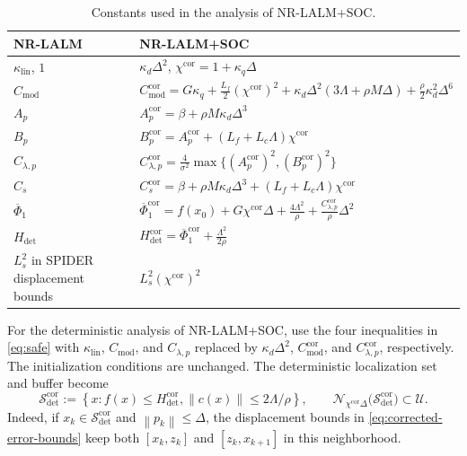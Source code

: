 \documentclass[11pt]{article}
\theoremstyle{definition}
\theoremstyle{remark}
\numberwithin{equation}{section}
\numberwithin{figure}{section}
\numberwithin{table}{section}
\numberwithin{algorithm}{section}
\newcommand{\norm}[1]{\left\lVert #1\right\rVert}
\begin{document}
\begin{table}[!t]
\caption{Constants used in the analysis of NR-LALM+SOC.}
\label{tab:corrected-constants}
\centering
\scriptsize
\renewcommand{\arraystretch}{0.94}
\begin{tabularx}{\textwidth}{@{}>{\raggedright\arraybackslash}p{}>{\raggedright\arraybackslash}X@{}}
\toprule
NR-LALM & NR-LALM+SOC\\
\midrule
\(\kappa_{\mathrm{lin}}\), \(1\)
& \(\kappa_d\Delta^2\),
  \(\chi^{\mathrm{cor}}=1+\kappa_q\Delta\)\\
\(C_{\mathrm{mod}}\)
& \(\displaystyle C_{\mathrm{mod}}^{\mathrm{cor}}
 =G\kappa_q+\frac{L_f}{2}(\chi^{\mathrm{cor}})^2
 +\kappa_d\Delta^2(3\Lambda+\rho M\Delta)
 +\frac{\rho}{2}\kappa_d^2\Delta^6\)\\
\(A_p\)
& \(\displaystyle A_p^{\mathrm{cor}}
 =\beta+\rho M\kappa_d\Delta^3\)\\
\(B_p\)
& \(\displaystyle B_p^{\mathrm{cor}}
 =A_p^{\mathrm{cor}}+(L_f+L_c\Lambda)\chi^{\mathrm{cor}}\)\\
\(C_{\lambda,p}\)
& \(\displaystyle C_{\lambda,p}^{\mathrm{cor}}
 =\frac{4}{\sigma^2}
 \max\{(A_p^{\mathrm{cor}})^2,(B_p^{\mathrm{cor}})^2\}\)\\
\(C_s\)
& \(\displaystyle C_s^{\mathrm{cor}}
 =\beta+\rho M\kappa_d\Delta^3
 +(L_f+L_c\Lambda)\chi^{\mathrm{cor}}\)\\
\(\overline\Phi_1\)
& \(\displaystyle \overline\Phi_1^{\mathrm{cor}}
 =f(x_0)+G\chi^{\mathrm{cor}}\Delta+\frac{4\Lambda^2}{\rho}
 +\frac{C_{\lambda,p}^{\mathrm{cor}}}{\rho}\Delta^2\)\\
\(H_{\mathrm{det}}\)
& \(\displaystyle H_{\mathrm{det}}^{\mathrm{cor}}
 =\overline\Phi_1^{\mathrm{cor}}+\frac{\Lambda^2}{2\rho}\)\\
\(L_s^2\) in SPIDER displacement bounds
& \(L_s^2(\chi^{\mathrm{cor}})^2\)\\
\bottomrule
\end{tabularx}
\end{table}

For the deterministic analysis of NR-LALM+SOC, use the four inequalities in \eqref{eq:safe} with
$\kappa_{\mathrm{lin}}$, $C_{\mathrm{mod}}$, and $C_{\lambda,p}$
replaced by $\kappa_d\Delta^2$, $C_{\mathrm{mod}}^{\mathrm{cor}}$, and $C_{\lambda,p}^{\mathrm{cor}}$, respectively.  The initialization conditions are unchanged.  The deterministic localization set and buffer become
\begin{equation}
 \mathcal S_{\mathrm{det}}^{\mathrm{cor}}
 :=\left\{x:f(x)\le H_{\mathrm{det}}^{\mathrm{cor}},
          \norm{c(x)}\le2\Lambda/\rho\right\},\qquad
 \mathcal N_{\chi^{\mathrm{cor}}\Delta}
 \bigl(\mathcal S_{\mathrm{det}}^{\mathrm{cor}}\bigr)\subset\mathcal U.
\label{eq:corrected-det-buffer}
\end{equation}
Indeed, if $x_k\in\mathcal S_{\mathrm{det}}^{\mathrm{cor}}$ and
$\norm{p_k}\le\Delta$, the displacement bounds in
\eqref{eq:corrected-error-bounds} keep both
$[x_k,z_k]$ and $[z_k,x_{k+1}]$ in this neighborhood.
\end{document}
